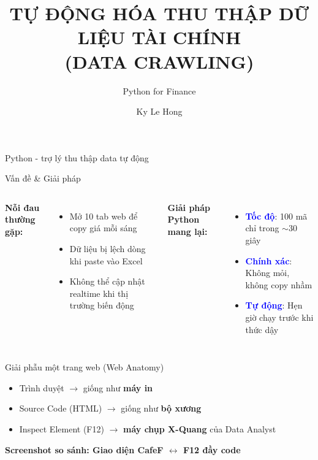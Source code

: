 \documentclass[10pt]{beamer}
\title{TỰ ĐỘNG HÓA THU THẬP DỮ LIỆU TÀI CHÍNH \\ (DATA CRAWLING)}
\subtitle{Python for Finance}
\author{Ky Le Hong}
\institute{Hà Nội, Tháng 01/2026}
\begin{document}
\begin{frame}
  \titlepage
  \vspace{1em}
  \centering
  \Large Python - trợ lý thu thập data tự động
\end{frame}

\begin{frame}{Vấn đề \& Giải pháp}
  \begin{columns}[T]
      \textbf{Nỗi đau thường gặp:}
      \begin{itemize}
        \item Mở 10 tab web để copy giá mỗi sáng
        \item Dữ liệu bị lệch dòng khi paste vào Excel
        \item Không thể cập nhật realtime khi thị trường biến động
      \end{itemize}

      \textbf{Giải pháp Python mang lại:}
      \begin{itemize}
        \item \textcolor{blue}{\textbf{Tốc độ}}: 100 mã chỉ trong $\sim$30 giây
        \item \textcolor{blue}{\textbf{Chính xác}}: Không mỏi, không copy nhầm
        \item \textcolor{blue}{\textbf{Tự động}}: Hẹn giờ chạy trước khi thức dậy
      \end{itemize}
  \end{columns}
\end{frame}

\begin{frame}{Giải phẫu một trang web (Web Anatomy)}
  \begin{itemize}
    \item Trình duyệt \quad $\rightarrow$ \quad giống như \textbf{máy in}
    \item Source Code (HTML) \quad $\rightarrow$ \quad giống như \textbf{bộ xương}
    \item Inspect Element (F12) \quad $\rightarrow$ \quad \textbf{máy chụp X-Quang} của Data Analyst
  \end{itemize}

  \vspace{1.2em}
  \centering
  \large\textbf{Screenshot so sánh: Giao diện CafeF $\leftrightarrow$ F12 đầy code}
\end{frame}
\end{document}
